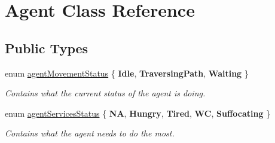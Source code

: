 \hypertarget{class_agent}{}\section{Agent Class Reference}
\label{class_agent}
\subsection*{Public Types}
\begin{DoxyCompactItemize}
\item 
enum \hyperlink{class_agent_af0b2c4596f7df623b5912509a09d0449}{agent\+Movement\+Status} \{ {\bfseries Idle}, 
{\bfseries Traversing\+Path}, 
{\bfseries Waiting}
 \}\begin{DoxyCompactList}\small\item\em Contains what the current status of the agent is doing. \end{DoxyCompactList}
\item 
enum \hyperlink{class_agent_ac7c6344403211868f101f7903fa9cb82}{agent\+Services\+Status} \{ \newline
{\bfseries NA}, 
{\bfseries Hungry}, 
{\bfseries Tired}, 
{\bfseries WC}, 
\newline
{\bfseries Suffocating}
 \}\begin{DoxyCompactList}\small\item\em Contains what the agent needs to do the most. \end{DoxyCompactList}
\end{DoxyCompactItemize}
